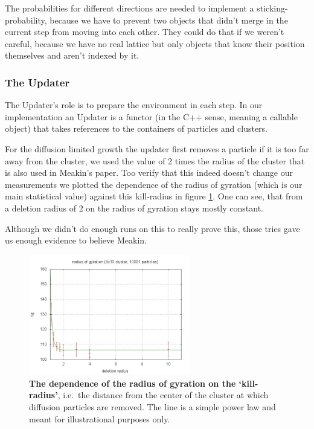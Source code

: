 \documentclass[twocolumn,10pt]{scrartcl}
\begin{document}
                The probabilities for different directions are needed to implement a sticking-probability, because we
                have to prevent two objects that didn't merge in the current step from moving into each other. They
                could do that if we weren't careful, because we have no real lattice but only objects that know their
                position themselves and aren't indexed by it.

            \subsubsection{The Updater}
                The Updater's role is to prepare the environment in each step. In our implementation an Updater is a
                functor (in the C++ sense, meaning a callable object) that takes references to the containers of
                particles and clusters.

                For the diffusion limited growth the updater first removes a particle if it is too far away from the
                cluster, we used the value of 2 times the radius of the cluster that is also used in Meakin's paper. Too
                verify that this indeed doesn't change our measurements we plotted the dependence of the radius of
                gyration (which is our main statistical value) against this kill-radius in figure \ref{fig-killradius}.
                One can see, that from a deletion radius of 2 on the radius of gyration stays mostly constant.
                
                Although we didn't do enough runs on this to really prove this, those tries gave us enough evidence to
                believe Meakin.
                \begin{figure}
                    \center
                    \includegraphics[width=7cm]{img/killradius.jpg}
                    \caption[The dependence of the radius of gyration on the `kill-radius']
                        {\small\textbf{The dependence of the radius of gyration on the `kill-radius'}, i.e.\ the distance
                        from the center of the cluster at which diffusion particles are removed. The line is a simple power
                        law and meant for illustrational purposes only.}
                    \label{fig-killradius}
                \end{figure}
\end{document}
